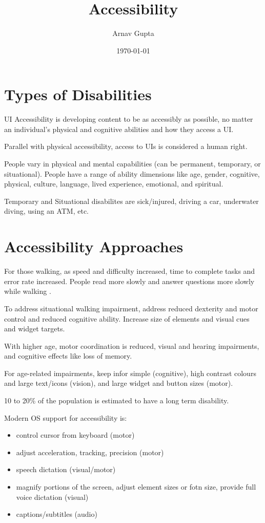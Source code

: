 \documentclass[11pt]{article}
\author{Arnav Gupta}
\date{\today}
\title{Accessibility}
\begin{document}
\maketitle
\tableofcontents

\section{Types of Disabilities}
\label{sec:orgb92876a}
UI Accessibility is developing content to be as accessibly as possible, no matter an individual's
physical and cognitive abilities and how they access a UI.

Parallel with physical accessibility, access to UIs is considered a human right.

People vary in physical and mental capabilities (can be permanent, temporary, or situational).
People have a range of ability dimensions like age, gender, cognitive, physical, culture,
language, lived experience, emotional, and spiritual.

Temporary and Situational disabilites are sick/injured, driving a car, underwater diving, using
an ATM, etc.
\section{Accessibility Approaches}
\label{sec:orge66be48}
For those walking, as speed and difficulty increased, time to complete tasks and error rate
increased.
People read more slowly and answer questions more slowly while walking .

To address situational walking impairment, address reduced dexterity and motor control and
reduced cognitive ability.
Increase size of elements and visual cues and widget targets.

With higher age, motor coordination is reduced, visual and hearing impairments, and cognitive
effects like loss of memory.

For age-related impairments, keep infor simple (cognitive), high contrast colours and large
text/icons (vision), and large widget and button sizes (motor).

10 to 20\% of the population is estimated to have a long term disability.

Modern OS support for accessibility is:
\begin{itemize}
\item control cursor from keyboard (motor)
\item adjust acceleration, tracking, precision (motor)
\item speech dictation (visual/motor)
\item magnify portions of the screen, adjust element sizes or fotn size, provide full voice
dictation (visual)
\item captions/subtitles (audio)
\end{itemize}
\end{document}

